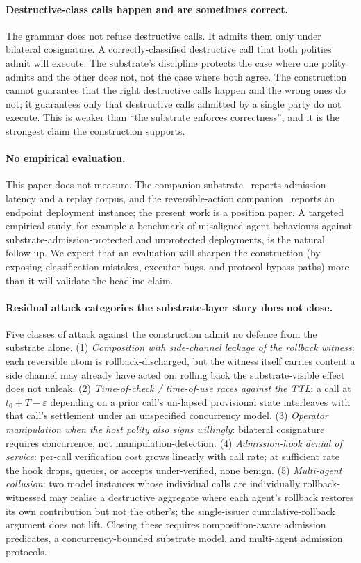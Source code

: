 \paragraph{Destructive-class calls happen and are sometimes correct.}
The grammar does not refuse destructive calls. It admits them only under bilateral cosignature. A correctly-classified destructive call that both polities admit will execute. The substrate's discipline protects the case where one polity admits and the other does not, not the case where both agree. The construction cannot guarantee that the right destructive calls happen and the wrong ones do not; it guarantees only that destructive calls admitted by a single party do not execute. This is weaker than ``the substrate enforces correctness'', and it is the strongest claim the construction supports.

\paragraph{No empirical evaluation.}
This paper does not measure. The companion substrate~\cite{programmableSovereignty2026} reports admission latency and a replay corpus, and the reversible-action companion~\cite{reversibleAction2026} reports an endpoint deployment instance; the present work is a position paper. A targeted empirical study, for example a benchmark of misaligned agent behaviours against substrate-admission-protected and unprotected deployments, is the natural follow-up. We expect that an evaluation will sharpen the construction (by exposing classification mistakes, executor bugs, and protocol-bypass paths) more than it will validate the headline claim.

\paragraph{Residual attack categories the substrate-layer story does not close.}
Five classes of attack against the construction admit no defence from the substrate alone. (1) \emph{Composition with side-channel leakage of the rollback witness}: each reversible atom is rollback-discharged, but the witness itself carries content a side channel may already have acted on; rolling back the substrate-visible effect does not unleak. (2) \emph{Time-of-check / time-of-use races against the TTL}: a call at $t_0 + T - \varepsilon$ depending on a prior call's un-lapsed provisional state interleaves with that call's settlement under an unspecified concurrency model. (3) \emph{Operator manipulation when the host polity also signs willingly}: bilateral cosignature requires concurrence, not manipulation-detection. (4) \emph{Admission-hook denial of service}: per-call verification cost grows linearly with call rate; at sufficient rate the hook drops, queues, or accepts under-verified, none benign. (5) \emph{Multi-agent collusion}: two model instances whose individual calls are individually rollback-witnessed may realise a destructive aggregate where each agent's rollback restores its own contribution but not the other's; the single-issuer cumulative-rollback argument does not lift. Closing these requires composition-aware admission predicates, a concurrency-bounded substrate model, and multi-agent admission protocols.


